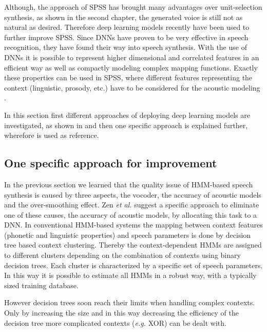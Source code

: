{\color{ACMRed}Although, the approach of \ac{SPSS} has brought many advantages over unit-selection synthesis, as shown in the second chapter, the generated voice is still not as natural as desired. Therefore deep learning models recently have been used to further improve \ac{SPSS}. Since \acp{DNN} have proven to be very effective in speech recognition, they have found their way into speech synthesis. With the use of \acp{DNN} it is possible to represent higher dimensional and correlated features in an efficient way as well as compactly modeling complex mapping functions. Exactly these properties can be used in \ac{SPSS}, where different features representing the context (linguistic, prosody, etc.) have to be considered for the acoustic modeling \cite{hashimoto:effect}.}

{\color{ACMRed}In this section first different approaches of deploying deep learning models are investigated, as shown in \cite{hashimoto:effect} and then one specific approach is explained further, wherefore \cite{zen:deepstatistical} is used as reference.}

\subsection{One specific approach for improvement}
\label{subsec:deepspss}

In the previous section we learned that the quality issue of \ac{HMM}-based speech synthesis is caused by three aspects, the vocoder, the accuracy of acoustic models and the over-smoothing effect. Zen \textit{et al.} \cite{zen:deepstatistical} suggest a specific approach to eliminate one of these causes, the accuracy of acoustic models, by allocating this task to a \ac{DNN}. In conventional \ac{HMM}-based systems the mapping between context features (phonetic and linguistic properties) and speech parameters is done by decision tree based context clustering. Thereby the context-dependent \acp{HMM} are assigned to different clusters depending on the combination of contexts using binary decision trees. Each cluster is characterized by a specific set of speech parameters. In this way it is possible to estimate all \acp{HMM} in a robust way, with a typically sized training database.

However decision trees soon reach their limits when handling complex contexts. Only by increasing the size and in this way decreasing the efficiency of the decision tree more complicated contexts (\textit{e.g.} XOR) can be dealt with. 

